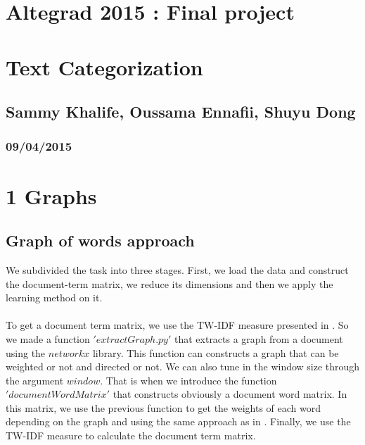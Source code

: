 
\geometry{hmargin=2.5cm,vmargin=2cm}   


\begin{center}

\section*{Altegrad 2015 : Final project}
\section*{Text Categorization}
\subsection*{Sammy Khalife, Oussama Ennafii, Shuyu Dong}
\subsubsection*{09/04/2015}

\end{center}

\section*{1 Graphs}
\subsection*{Graph of words approach}

We subdivided the task into three stages. First, we load the data and construct the document-term matrix, we reduce its dimensions and then we apply the learning method on it.~\\
~\\
To get a document term matrix, we use the TW-IDF measure presented in \cite{rousseau2013graph}. So we made a function $'extractGraph.py'$ that extracts a graph from a document using the $networkx$ library. This function can constructs a graph that can be weighted or not and directed or not. We can also tune in the window size through the argument $window$. That is when we introduce the function $'documentWordMatrix'$ that constructs obviously a document word matrix. In this matrix, we use the previous function to get the weights of each word depending on the graph and using the same approach as in \cite{rousseau2013graph}. Finally, we use the TW-IDF measure to calculate the document term matrix.\\

